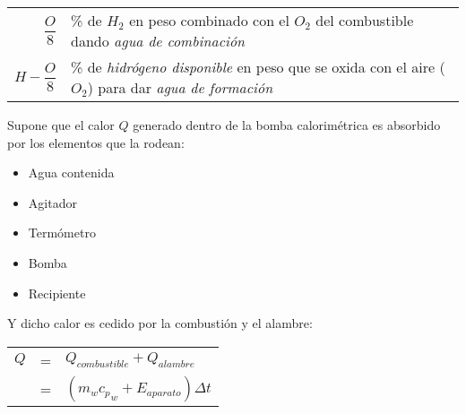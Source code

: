 \documentclass[11pt,a4paper]{article}
\begin{document}
\begin{multicols}{2}
\begin{cajita}
			\vspace{-.2cm}
			
			\vspace{.2cm}
			
			\begin{tabular}{r p{.7\linewidth}}
				$\dfrac{O}{8}$ & \% de $H_2$ en peso combinado con el $O_2$ del combustible dando \emph{agua de combinación}\\
				$H - \dfrac{O}{8}$ & \% de \emph{hidrógeno disponible} en peso que se oxida con el aire ($O_2$) para dar \emph{agua de formación}
			\end{tabular}
		\end{cajita}
	\end{multicols}
	
	\begin{cajita}
		
		
		\vspace{-.6cm}
		
		\begin{multicols}{2}
			\begin{flushleft}
				Supone que el calor $Q$ generado dentro de la bomba calorimétrica es absorbido por los elementos que la rodean:
				\begin{itemize}
					\item Agua contenida\\[.1cm]
					\item Agitador\\[.1cm]
					\item Termómetro\\[.1cm]
					\item Bomba\\[.1cm]
					\item Recipiente
				\end{itemize} 
			
				Y dicho calor es cedido por la combustión y el alambre:
			\end{flushleft} 
			\begin{tabular}{r c l}
				$Q$ & = & $Q_{combustible} + Q_{alambre}$\\[.2cm]
					& = & $\left(m_{w} {c_p}_{w} + E_{aparato}\right) \Delta t$\\[.2cm]
			\end{tabular}
			
			
			

\end{multicols}
\end{cajita}
\end{document}
